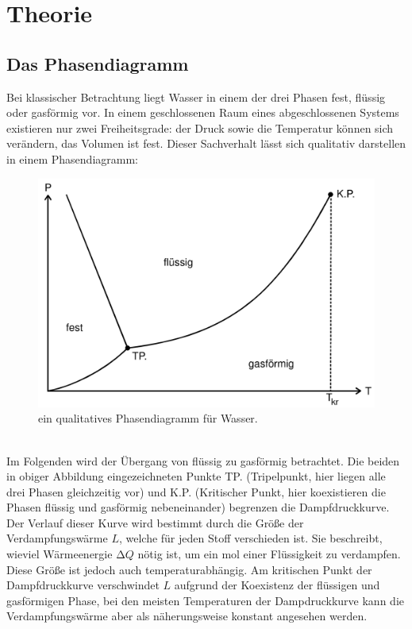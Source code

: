 \section{Theorie}
  \subsection{Das Phasendiagramm}
  \label{sec:phasendiagramm}
  Bei klassischer Betrachtung liegt Wasser in einem der drei Phasen fest, flüssig oder gasförmig vor. In einem geschlossenen Raum eines abgeschlossenen Systems existieren nur
  zwei Freiheitsgrade: der Druck sowie die Temperatur können sich verändern, das Volumen ist fest. Dieser Sachverhalt lässt sich qualitativ darstellen in einem Phasendiagramm:
  \\
  \begin{figure}
    \centering
    \label{fig:phasendiagramm}
      \includegraphics[scale = 0.2]{Content/phasendiagramm.png}
      \caption{ein qualitatives Phasendiagramm für Wasser.}
  \end{figure}
  \\
  \noindent
  Im Folgenden wird der Übergang von flüssig zu gasförmig betrachtet. Die beiden in obiger Abbildung eingezeichneten Punkte TP.
  (Tripelpunkt, hier liegen alle drei Phasen gleichzeitig vor) und K.P. (Kritischer Punkt, hier koexistieren die Phasen flüssig
  und gasförmig nebeneinander)
  begrenzen die Dampfdruckkurve. Der Verlauf dieser Kurve wird bestimmt durch die Größe der Verdampfungswärme $L$, welche für
  jeden Stoff verschieden ist. Sie beschreibt,
  wieviel Wärmeenergie $\increment Q$ nötig ist, um ein mol einer Flüssigkeit zu verdampfen. Diese Größe ist jedoch auch
  temperaturabhängig. Am kritischen Punkt der
  Dampfdruckkurve verschwindet $L$ aufgrund der Koexistenz der flüssigen und gasförmigen Phase, bei den meisten Temperaturen der
  Dampdruckkurve kann die Verdampfungswärme
  aber als näherungsweise konstant angesehen werden.
